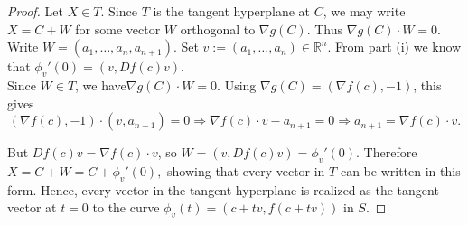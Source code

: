 \documentclass{article}
\begin{document}
\begin{proof}
Let $X \in T$. Since $T$ is the tangent hyperplane at $C$, we may write $X = C + W$ for some vector $W$ orthogonal to $\nabla g(C)$. Thus $\nabla g(C) \cdot W = 0.$ \\ 
Write $W = (a_1,\dots,a_n,a_{n+1}).$ Set $v := (a_1,\dots,a_n) \in \mathbb{R}^n.$
From part (i) we know that $\phi_v'(0) = (v, Df(c)v).$ \\
Since $W \in T$, we have$\nabla g(C) \cdot W = 0.$
Using $\nabla g(C) = (\nabla f(c), -1)$, this gives
\[
(\nabla f(c), -1)\cdot (v, a_{n+1}) = 0 \Rightarrow
\nabla f(c)\cdot v - a_{n+1} = 0 \Rightarrow a_{n+1} = \nabla f(c)\cdot v.
\]

But $Df(c)v = \nabla f(c)\cdot v$, so $W = (v, Df(c)v) = \phi_v'(0).$ Therefore$ X = C + W = C + \phi_v'(0),$ showing that every vector in $T$ can be written in this form.
Hence, every vector in the tangent hyperplane is realized as the tangent vector at $t=0$ to the curve $\phi_v(t) = (c + tv, f(c+tv))$ in $S$.
\end{proof}

\clearpage %
\end{document}
